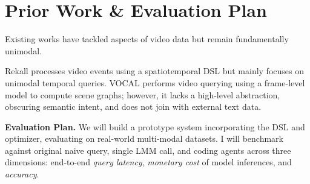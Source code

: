 \documentclass[sigconf,nonacm,screen]{acmart}
\begin{document}
\section{Prior Work \& Evaluation Plan}
Existing works have tackled aspects of video data but remain fundamentally unimodal. 

Rekall \cite{fu2019rekall} processes video events using a spatiotemporal DSL but mainly focuses on unimodal temporal queries. 
VOCAL \cite{zhang2025vocal} performs video querying using a frame-level model to compute scene graphs; however, 
it lacks a high-level abstraction, obscuring semantic intent, and does not join with external text data.


\textbf{Evaluation Plan.} We will build a prototype system incorporating the DSL and optimizer, 
evaluating on real-world multi-modal datasets. 
I will benchmark against original naive query, single LMM call, and coding agents across three dimensions: end-to-end \textit{query latency}, 
\textit{monetary cost} of model inferences, and \textit{accuracy}.



\end{document}

